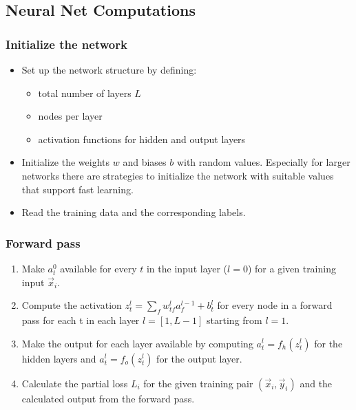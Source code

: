 \subsection{Neural Net Computations}

\subsubsection*{Initialize the network}

\begin{itemize}
    \item Set up the network structure by defining:
    \begin{itemize}
        \item total number of layers $L$
        \item nodes per layer
        \item activation functions for hidden and output layers
    \end{itemize}
    \item Initialize the weights $w$ and biases $b$ with random values. Especially for
    larger networks there are strategies to initialize the network with suitable values
    that support fast learning.
    \item Read the training data and the corresponding labels.
\end{itemize}

\subsubsection*{Forward pass}

\begin{enumerate}
    \item Make $a_t^0$ available for every $t$ in the input layer ($l=0$) for a given
    training input $\vec{x}_i$.
    \item Compute the activation $z_t^l = \sum\limits_{f} w_{tf}^l a_f^{l-1} + b_t^l$ for
    every node in a forward pass for each t in each layer $l = [1,L-1]$ starting from
    $l=1$.
    \item Make the output for each layer available by computing $a_t^l = f_h(z_t^l)$ for
    the hidden layers and $a_t^l = f_o(z_t^l)$ for the output layer.
    \item Calculate the partial loss $L_i$ for the given training pair $(\vec{x}_i,
    \vec{y}_i)$ and the calculated output from the forward pass.
\end{enumerate}

